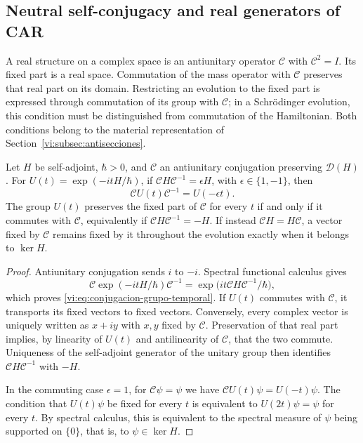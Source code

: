 \subsection{Neutral self-conjugacy and real generators of CAR}
\label{vi:subsec:majorana-categorias}

A real structure on a complex space is an antiunitary operator
$\mathcal C$ with $\mathcal C^2=I$. Its fixed part is a real space.
Commutation of the mass operator with $\mathcal C$ preserves that
real part on its domain. Restricting an evolution to the fixed
part is expressed through commutation of its group with $\mathcal C$;
in a Schr\"odinger evolution, this condition must be distinguished
from commutation of the Hamiltonian. Both conditions belong to the
material representation of Section~\ref{vi:subsec:antisecciones}.

\begin{proposition}
\label{vi:prop:conjugacion-evolucion}
Let $H$ be self-adjoint, $\hbar>0$, and $\mathcal C$ an antiunitary
conjugation preserving $\mathcal D(H)$. For
$U(t)=\exp(-itH/\hbar)$, if
$\mathcal C H\mathcal C^{-1}=\epsilon H$, with
$\epsilon\in\{1,-1\}$, then
\begin{equation}
 \mathcal C U(t)\mathcal C^{-1}=U(-\epsilon t).
 \label{vi:eq:conjugacion-grupo-temporal}
\end{equation}
The group $U(t)$ preserves the fixed part of $\mathcal C$ for every $t$
if and only if it commutes with $\mathcal C$, equivalently if
$\mathcal C H\mathcal C^{-1}=-H$.
If instead $\mathcal C H=H\mathcal C$, a vector fixed by
$\mathcal C$ remains fixed by it throughout the evolution
exactly when it belongs to $\ker H$.
\end{proposition}
\begin{proof}
Antiunitary conjugation sends $i$ to $-i$. Spectral functional
calculus gives
\[
 \mathcal C\exp(-itH/\hbar)\mathcal C^{-1}
 =\exp\bigl(it\mathcal C H\mathcal C^{-1}/\hbar\bigr),
\]
which proves \eqref{vi:eq:conjugacion-grupo-temporal}. If $U(t)$ commutes
with $\mathcal C$, it transports its fixed vectors to fixed vectors.
Conversely, every complex vector is uniquely written as
$x+iy$ with $x,y$ fixed by $\mathcal C$. Preservation of that real
part implies, by linearity of $U(t)$ and antilinearity of
$\mathcal C$, that the two commute. Uniqueness of the self-adjoint
generator of the unitary group then identifies
$\mathcal C H\mathcal C^{-1}$ with $-H$.

In the commuting case $\epsilon=1$, for $\mathcal C\psi=\psi$
we have $\mathcal C U(t)\psi=U(-t)\psi$. The condition that $U(t)\psi$ be fixed
for every $t$ is equivalent to $U(2t)\psi=\psi$ for every $t$. By
spectral calculus, this is equivalent to the spectral measure of $\psi$
being supported on $\{0\}$, that is, to $\psi\in\ker H$.
\end{proof}

